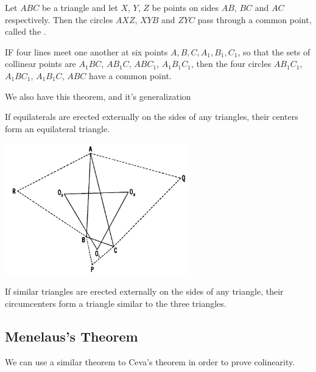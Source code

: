 \documentclass[DIV=12, a4]{scrartcl}
\begin{document}
\begin{corollary}
	Let $ABC$ be a triangle and let $X$, $Y$, $Z$ be points on sides $AB$, $BC$ and $AC$ respectively. Then the circles $AXZ$, $XYB$ and $ZYC$ pass through a common point, called the . 
\end{corollary}

\begin{theorem}
	IF four lines meet one another at six points $A, B, C, A_1, B_1, C_1$, so that the sets of collinear points are $A_1 BC$, $AB_1C$, $ABC_1$, $A_1 B_1 C_1$, then the four circles $AB_1 C_1$, $A_1 B C_1$, $A_1 B_1 C$, $ABC$ have a common point.
\end{theorem}

We also have this theorem, and it's generalization

\begin{theorem}
	If equilaterals are erected externally on the sides of any triangles, their centers form an equilateral triangle.
\end{theorem}

 \begin{center}
		\includegraphics[width=0.6\textwidth]{media/3-3B}
\end{center}

\begin{theorem}
	If similar triangles are erected externally on the sides of any triangle, their circumcenters form a triangle similar to the three triangles.
\end{theorem}

\subsection{Menelaus's Theorem}

We can use a similar theorem to Ceva's theorem in order to prove colinearity.
\end{document}
